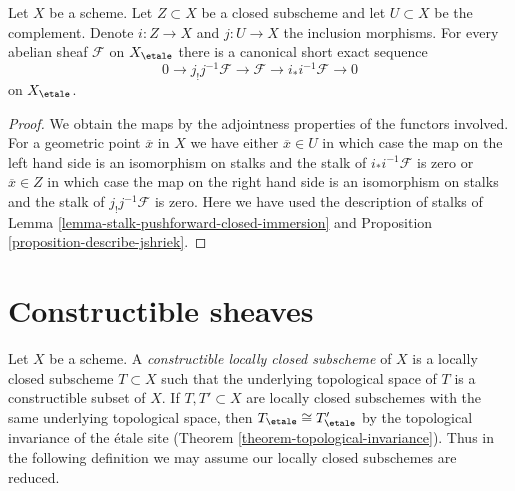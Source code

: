\begin{lemma}
\label{lemma-ses-associated-to-open}
Let $X$ be a scheme. Let $Z \subset X$ be a closed subscheme and let
$U \subset X$ be the complement. Denote $i : Z \to X$ and $j : U \to X$
the inclusion morphisms. For every abelian sheaf $\mathcal{F}$ on $X_\etale$
there is a canonical short exact sequence
$$
0 \to j_!j^{-1}\mathcal{F} \to \mathcal{F} \to i_*i^{-1}\mathcal{F} \to 0
$$
on $X_\etale$.
\end{lemma}

\begin{proof}
We obtain the maps by the adjointness properties of the functors
involved. For a geometric point $\overline{x}$ in $X$ we have either
$\overline{x} \in U$ in which case the map on the left hand side
is an isomorphism on stalks and the stalk of $i_*i^{-1}\mathcal{F}$
is zero or $\overline{x} \in Z$ in which case the map on the right hand side
is an isomorphism on stalks and the stalk of $j_!j^{-1}\mathcal{F}$
is zero. Here we have used the description of stalks of
Lemma \ref{lemma-stalk-pushforward-closed-immersion} and
Proposition \ref{proposition-describe-jshriek}.
\end{proof}







\section{Constructible sheaves}
\label{section-constructible}

\noindent
Let $X$ be a scheme. A {\it constructible locally closed subscheme} of $X$
is a locally closed subscheme $T \subset X$ such that the underlying
topological space of $T$ is a constructible subset of $X$.
If $T, T' \subset X$ are locally
closed subschemes with the same underlying topological space, then
$T_\etale \cong T'_\etale$ by the topological
invariance of the \'etale site (Theorem \ref{theorem-topological-invariance}).
Thus in the following definition we may assume our locally closed
subschemes are reduced.

